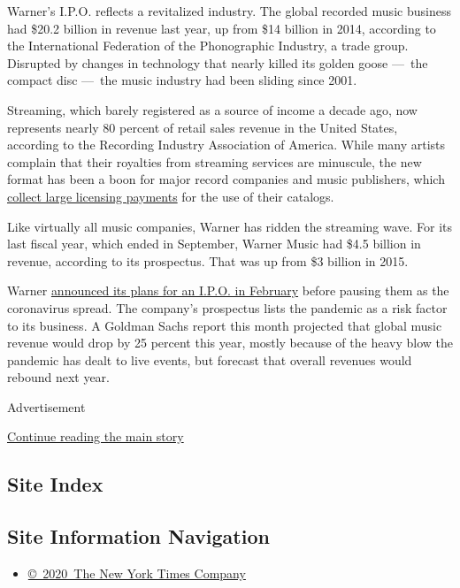 Warner's I.P.O. reflects a revitalized industry. The global recorded
music business had \$20.2 billion in revenue last year, up from \$14
billion in 2014, according to the International Federation of the
Phonographic Industry, a trade group. Disrupted by changes in technology
that nearly killed its golden goose ---~the compact disc ---~the music
industry had been sliding since 2001.

Streaming, which barely registered as a source of income a decade ago,
now represents nearly 80 percent of retail sales revenue in the United
States, according to the Recording Industry Association of America.
While many artists complain that their royalties from streaming services
are minuscule, the new format has been a boon for major record companies
and music publishers, which
\href{https://www.nytimes3xbfgragh.onion/2018/03/31/business/media/spotify-streaming-music.html}{collect
large licensing payments} for the use of their catalogs.

Like virtually all music companies, Warner has ridden the streaming
wave. For its last fiscal year, which ended in September, Warner Music
had \$4.5 billion in revenue, according to its prospectus. That was up
from \$3 billion in 2015.

Warner
\href{https://variety.com/2020/music/news/warner-music-group-ipo-wall-street-1203501100/}{announced
its plans for an I.P.O. in February} before pausing them as the
coronavirus spread. The company's prospectus lists the pandemic as a
risk factor to its business. A Goldman Sachs report this month projected
that global music revenue would drop by 25 percent this year, mostly
because of the heavy blow the pandemic has dealt to live events, but
forecast that overall revenues would rebound next year.

Advertisement

\protect\hyperlink{after-bottom}{Continue reading the main story}

\hypertarget{site-index}{%
\subsection{Site Index}\label{site-index}}

\hypertarget{site-information-navigation}{%
\subsection{Site Information
Navigation}\label{site-information-navigation}}

\begin{itemize}
\tightlist
\item
  \href{https://help.nytimes3xbfgragh.onion/hc/en-us/articles/115014792127-Copyright-notice}{©~2020~The
  New York Times Company}
\end{itemize}

